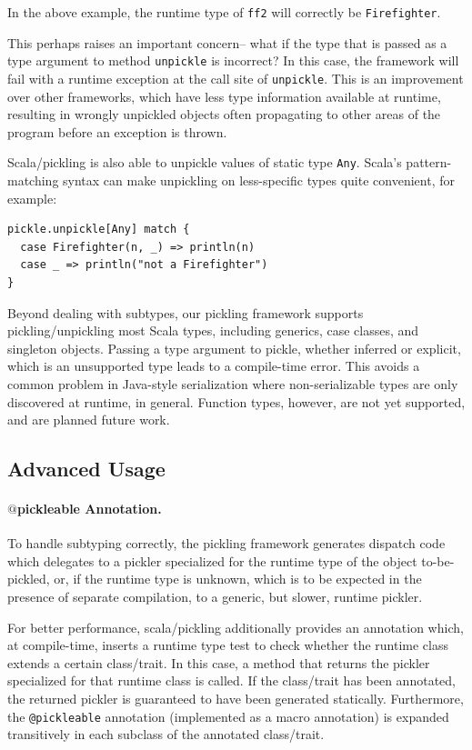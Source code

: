 \documentclass[10pt]{sigplanconf}
\theoremstyle{definition}
\theoremstyle{definition}
\newcommand{\term}[1]{\mbox{\texttt{#1}}}
\begin{document}
In the above example, the runtime type of \term{ff2} will correctly be
\term{Firefighter}.

This perhaps raises an important concern-- what if the type that is passed as
a type argument to method \term{unpickle} is incorrect? In this case, the
framework will fail with a runtime exception at the call site of
\term{unpickle}. This is an improvement over other frameworks, which have less
type information available at runtime, resulting in wrongly unpickled objects
often propagating to other areas of the program before an exception is thrown.

Scala/pickling is also able to unpickle values of static type
\term{Any}. Scala's pattern-matching syntax can make unpickling on less-specific
types quite convenient, for example:

\begin{lstlisting}
pickle.unpickle[Any] match {
  case Firefighter(n, _) => println(n)
  case _ => println("not a Firefighter")
}
\end{lstlisting}

Beyond dealing with subtypes, our pickling framework supports
pickling/unpickling most Scala types, including generics, case classes, and
singleton objects. Passing a type argument to pickle, whether inferred or
explicit, which is an unsupported type leads to a compile-time error. This
avoids a common problem in Java-style serialization where non-serializable
types are only discovered at runtime, in general. Function types, however, are
not yet supported, and are planned future work.

\subsection{Advanced Usage}
\label{sec:pickleable-annotation}

\paragraph{$@$pickleable Annotation.} To handle subtyping correctly, the
pickling framework generates dispatch code which delegates to a pickler
specialized for the runtime type of the object to-be-pickled, or, if the
runtime type is unknown, which is to be expected in the presence of separate
compilation, to a generic, but slower, runtime pickler.

For better performance, scala/pickling additionally provides an
annotation which, at compile-time, inserts a runtime type test to check whether
the runtime class extends a certain class/trait. In this case, a
method that returns the pickler specialized for that runtime class is called. If the
class/trait has been annotated, the returned pickler is guaranteed to have been generated
statically. Furthermore, the \verb|@pickleable| annotation (implemented as a macro annotation)
is expanded transitively in each subclass of the annotated class/trait.
\end{document}
